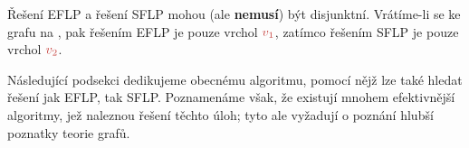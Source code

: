 \begin{warning}
 Řešení EFLP a řešení SFLP mohou (ale \textbf{nemusí}) být disjunktní.
 Vrátíme-li se ke grafu na , pak řešením
 EFLP je pouze vrchol $\clr{v_1}$, zatímco řešením SFLP je pouze vrchol
 $\clr{v_2}$. 
\end{warning}

Následující podsekci dedikujeme obecnému algoritmu, pomocí nějž lze také hledat
řešení jak EFLP, tak SFLP. Poznamenáme však, že existují mnohem efektivnější
algoritmy, jež naleznou řešení těchto úloh; tyto ale vyžadují o poznání hlubší
poznatky teorie grafů.



